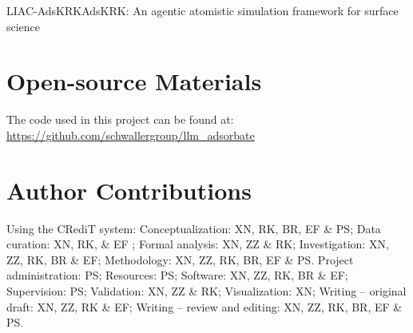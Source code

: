 \begin{teamsubmission}{LIAC-AdsKRK}{AdsKRK: An agentic atomistic simulation framework for surface science}
\section*{Open-source Materials}
The code used in this project can be found at: \href{https://github.com/schwallergroup/llm_adsorbate}{https://github.com/schwallergroup/llm\_adsorbate}


\section*{Author Contributions}
Using the CRediT system: Conceptualization: XN, RK, BR, EF \& PS;
Data curation: XN, RK, \& EF ;
Formal analysis: XN, ZZ \& RK;
Investigation: XN, ZZ, RK, BR \& EF;
Methodology: XN, ZZ, RK, BR, EF \& PS. 
Project administration: PS;
Resources: PS;
Software: XN, ZZ, RK, BR \& EF;
Supervision: PS;
Validation: XN, ZZ \& RK; 
Visualization: XN;
Writing -- original draft: XN, ZZ, RK \& EF;
Writing -- review and editing: XN, ZZ, RK, BR, EF \& PS.

\end{teamsubmission}




